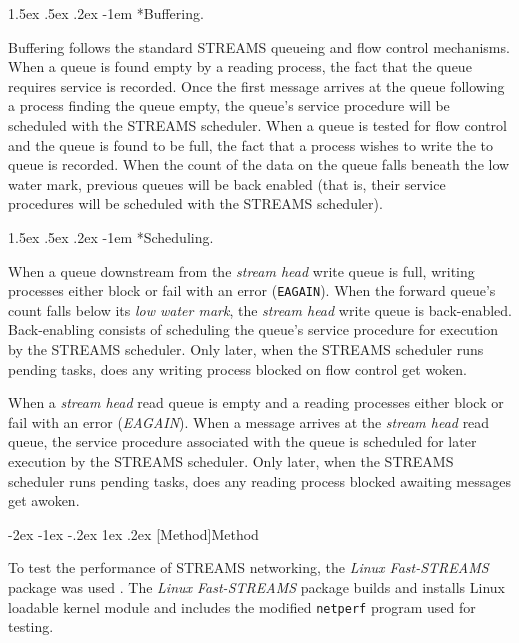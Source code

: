\documentclass[letterpaper,final,notitlepage,twocolumn,10pt,twoside]{article}
\makeatletter
\renewcommand\section{\@startsection {section}{1}{\z@}%
                                   {-2ex \@plus -1ex \@minus -.2ex}%
                                   {1ex \@plus .2ex}%
                                   {\normalfont\large\bfseries}}
\renewcommand\paragraph{\@startsection{paragraph}{4}{\z@}%
                                    {1.5ex \@plus .5ex \@minus .2ex}%
                                    {-1em}%
                                    {\normalfont\normalsize\bfseries\slshape}}
\makeatother
\begin{document}
\paragraph*{Buffering.}

Buffering follows the standard STREAMS queueing and flow control mechanisms.
When a queue is found empty by a reading process, the fact that the queue
requires service is recorded.  Once the first message arrives at the queue
following a process finding the queue empty, the queue's service procedure
will be scheduled with the STREAMS scheduler.  When a queue is tested for flow
control and the queue is found to be full, the fact that a process wishes to
write the to queue is recorded.  When the count of the data on the queue falls
beneath the low water mark, previous queues will be back enabled (that is,
their service procedures will be scheduled with the STREAMS scheduler).

\paragraph*{Scheduling.}

When a queue downstream from the \textit{stream head} write queue is full,
writing processes either block or fail with an error (\texttt{EAGAIN}).  When
the forward queue's count falls below its \textit{low water mark}, the
\textit{stream head} write queue is back-enabled.  Back-enabling consists of
scheduling the queue's service procedure for execution by the STREAMS
scheduler.  Only later, when the STREAMS scheduler runs pending tasks, does
any writing process blocked on flow control get woken.

When a \textit{stream head} read queue is empty and a reading processes either
block or fail with an error (\textit{EAGAIN}).  When a message arrives at the
\textit{stream head} read queue, the service procedure associated with the
queue is scheduled for later execution by the STREAMS scheduler.  Only later,
when the STREAMS scheduler runs pending tasks, does any reading process
blocked awaiting messages get awoken.

\section[Method]{Method}

To test the performance of STREAMS networking, the \textsl{Linux Fast-STREAMS}
package was used \cite[]{LfS}.  The \textsl{Linux Fast-STREAMS} package builds
and installs Linux loadable kernel module and includes the modified
\texttt{netperf} program used for testing.
\end{document}
